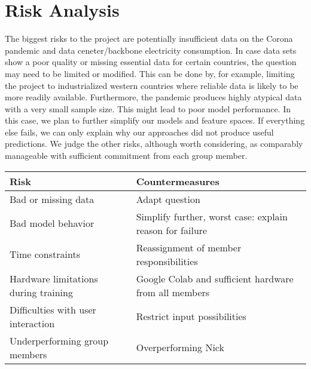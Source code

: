 \documentclass[s=english,inputenc=utf8,fontsize=10pt]{ldvarticle}
\begin{document}
\newpage

\section{Risk Analysis}

The biggest risks to the project are potentially insufficient data on the Corona pandemic and data ceneter/backbone electricity consumption. In case data sets show a poor quality or missing essential data for certain countries, the question may need to be limited or modified. This can be done by, for example, limiting the project to industrialized western countries where reliable data is likely to be more readily available. Furthermore, the pandemic produces highly atypical data with a very small sample size. This might lead to poor model performance. In this case, we plan to further simplify our models and feature spaces. If everything else fails, we can only explain why our approaches did not produce useful predictions. We judge the other risks, although worth considering, as comparably manageable with sufficient commitment from each group member.
\begin{center}
	\begin{footnotesize}
		\setlength{\arrayrulewidth}{1,05pt}
		\begin{tabular}[htb]{|p{5cm}|p{7.1cm}|}
			\hline
			\textbf{Risk} & \textbf{Countermeasures} \\
			\hline
			\hline
			\rowcolor{lightgray} Bad or missing data & Adapt question \\
			\hline
			\rowcolor{lightgray} Bad model behavior & Simplify further, worst case: explain reason for failure \\
			\hline	
			\rowcolor{lightgray} Time constraints & Reassignment of member responsibilities \\
			\hline
			\rowcolor{lightgray} Hardware limitations during training & Google Colab and sufficient hardware from all members\\
			\hline
			\rowcolor{lightgray} Difficulties with user interaction & Restrict input possibilities \\
			\hline
			\rowcolor{lightgray} Underperforming group members & Overperforming Nick \\
			\hline	
		\end{tabular}
	\end{footnotesize}
\end{center}
\end{document}
